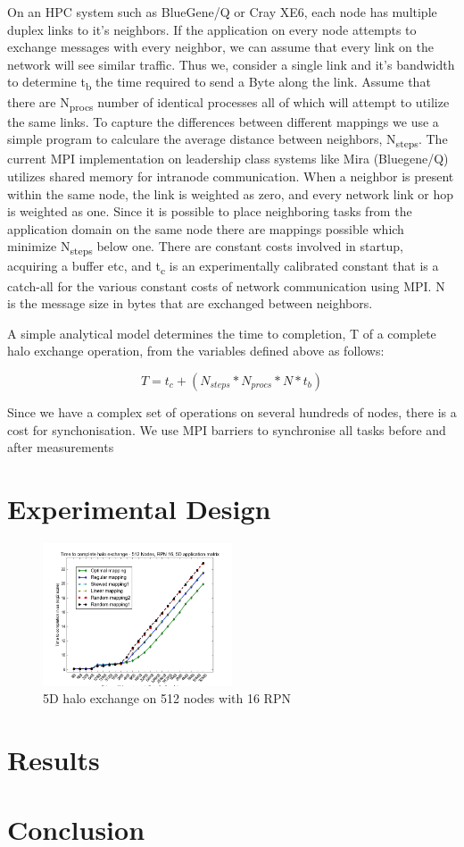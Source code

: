 \documentclass{acm_proc_article-sp}
\begin{document}
On an HPC system such as BlueGene/Q or Cray XE6, each node has multiple duplex links to it's neighbors.
If the application on every node attempts to exchange messages with every neighbor, we can assume that
every link on the network will see similar traffic. Thus we, consider a single link and it's bandwidth
to determine t\textsubscript{b} the time required to send a Byte along the link. Assume that there are N\textsubscript{procs} number
of identical processes all of which will attempt to utilize the same links. To capture the differences
between different mappings we use a simple program to calculare the average distance between neighbors,
N\textsubscript{steps}. The current MPI implementation on leadership class systems like Mira (Bluegene/Q) utilizes
shared memory for intranode communication. When a neighbor is present within the same node, the link
is weighted as zero, and every network link or hop is weighted as one. Since it is possible to place
neighboring tasks from the application domain on the same node there are mappings possible which
minimize N\textsubscript{steps} below one. There are constant costs involved in startup, acquiring a buffer etc,
and t\textsubscript{c} is an experimentally calibrated constant that is a catch-all for the various constant costs
of network communication using MPI. N is the message size in bytes that are exchanged between neighbors.

A simple analytical model determines the time to completion, T of a complete halo exchange operation,
from the variables defined above as follows:

\begin{equation}
  T = t_c + (N_{steps} * N_{procs} * N * t_b)
\end{equation}

Since we have a complex set of operations on several hundreds of nodes, there is a cost for synchonisation.
We use MPI barriers to synchronise all tasks before and after measurements

\section{Experimental Design}

\label{sect:3D Halo plot}
\begin{figure}
  \center
  \includegraphics[width=0.5\textwidth]{5D_512_most_mappings_2.png}
  \caption{5D halo exchange on 512 nodes with 16 RPN}
    \label{fig:3D halo exchange on 512 nodes with 16 RPN}
\end{figure}


\section{Results}

\section{Conclusion}




\end{document}

